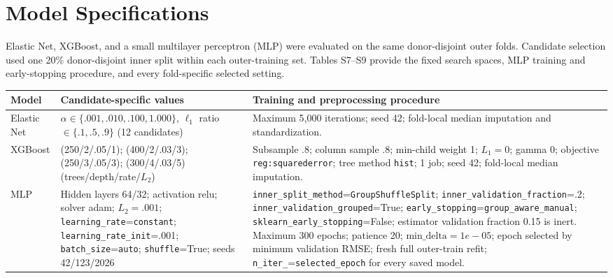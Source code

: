 \documentclass[11pt]{article}
\newcommand{\tablefont}{\fontsize{9.5}{11.2}\selectfont}
\newcommand{\sourcecaption}[1]{\Needspace{10\baselineskip}\vspace{2pt}{\small\bfseries #1}\par\vspace{2pt}}
\begin{document}
\section{Model Specifications}
Elastic Net, XGBoost, and a small multilayer perceptron (MLP) were evaluated on the same donor-disjoint outer folds. Candidate selection used one 20\% donor-disjoint inner split within each outer-training set. Tables S7--S9 provide the fixed search spaces, MLP training and early-stopping procedure, and every fold-specific selected setting.

\sourcecaption{Model search spaces, training procedures, and selected hyperparameters (Tables S7--S9).}
\begin{center}\tablefont
\setlength{\tabcolsep}{3pt}
\begin{tabularx}{\linewidth}{@{}p{.105\linewidth}p{.37\linewidth}Y@{}}
\toprule
Model & Candidate-specific values & Training and preprocessing procedure \\
\midrule
Elastic Net & $\alpha\in\{.001, .010, .100, 1.000\}$, $\ell_1$ ratio $\in\{.1, .5, .9\}$ (12 candidates) & Maximum 5,000 iterations; seed 42; fold-local median imputation and standardization. \\
XGBoost & (250/2/.05/1); (400/2/.03/3); (250/3/.05/3); (300/4/.03/5) (trees/depth/rate/$L_2$) & Subsample .8; column sample .8; min-child weight 1; $L_1=0$; gamma 0; objective \texttt{reg:squarederror}; tree method \texttt{hist}; 1 job; seed 42; fold-local median imputation. \\
MLP & Hidden layers 64/32; activation relu; solver adam; $L_2=.001$; \texttt{learning\_\allowbreak{}rate}=\texttt{constant}; \texttt{learning\_\allowbreak{}rate\_\allowbreak{}init}=.001; \texttt{batch\_\allowbreak{}size}=\texttt{auto}; \texttt{shuffle}=True; seeds 42/123/2026 & \texttt{inner\_\allowbreak{}split\_\allowbreak{}method}=\texttt{GroupShuffleSplit}; \texttt{inner\_\allowbreak{}validation\_\allowbreak{}fraction}=.2; \texttt{inner\_\allowbreak{}validation\_\allowbreak{}grouped}=True; \texttt{early\_\allowbreak{}stopping}=\texttt{group\_\allowbreak{}aware\_\allowbreak{}manual}; \texttt{sklearn\_\allowbreak{}early\_\allowbreak{}stopping}=False; estimator validation fraction 0.15 is inert. Maximum 300 epochs; patience 20; $\mathrm{min\_delta}=1e-05$; epoch selected by minimum validation RMSE; fresh full outer-train refit; \texttt{n\_\allowbreak{}iter\_\allowbreak{}}=\texttt{selected\_\allowbreak{}epoch} for every saved model. \\
\bottomrule
\end{tabularx}
\end{center}
\end{document}
